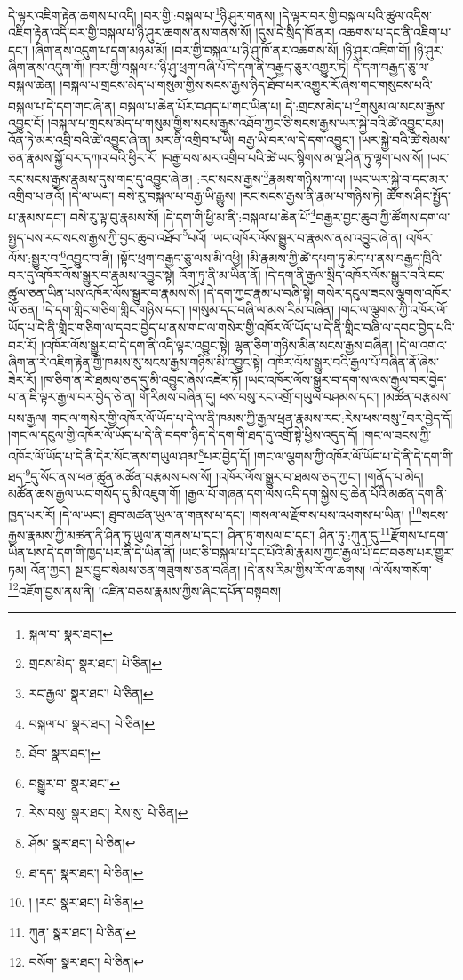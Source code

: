 དེ་ལྟར་འཇིག་རྟེན་ཆགས་པ་འདི། །བར་གྱི་:བསྐལ་པ་\footnote{སྐལ་བ་  སྣར་ཐང་། }ཉི་ཤུར་གནས། །དེ་ལྟར་བར་གྱི་བསྐལ་པའི་ཚུལ་འདིས་འཇིག་རྟེན་འདི་བར་གྱི་བསྐལ་པ་ཉི་ཤུར་ཆགས་ནས་གནས་སོ། །དུས་དེ་སྲིད་ཁོ་ནར། འཆགས་པ་དང་ནི་འཇིག་པ་དང་། །ཞིག་ནས་འདུག་པ་དག་མཉམ་མོ། །བར་གྱི་བསྐལ་པ་ཉི་ཤུ་ཁོ་ནར་འཆགས་སོ། །ཉི་ཤུར་འཇིག་གོ། །ཉི་ཤུར་ཞིག་ནས་འདུག་གོ། །བར་གྱི་བསྐལ་པ་ཉི་ཤུ་ཕྲག་བཞི་པོ་དེ་དག་ནི་བརྒྱད་ཅུར་འགྱུར་ཏེ། དེ་དག་བརྒྱད་ཅུ་ལ་བསྐལ་ཆེན། །བསྐལ་པ་གྲངས་མེད་པ་གསུམ་གྱིས་སངས་རྒྱས་ཉིད་ཐོབ་པར་འགྱུར་རོ་ཞེས་གང་གསུངས་པའི་བསྐལ་པ་དེ་དག་གང་ཞེ་ན། བསྐལ་པ་ཆེན་པོར་བཤད་པ་གང་ཡིན་པ། དེ་:གྲངས་མེད་པ་\footnote{གྲངས་མེད་  སྣར་ཐང་།  པེ་ཅིན། }གསུམ་ལ་སངས་རྒྱས་འབྱུང་ངོ། །བསྐལ་པ་གྲངས་མེད་པ་གསུམ་གྱིས་སངས་རྒྱས་འཐོབ་ཀྱང་ཅི་སངས་རྒྱས་ཡར་སྐྱེ་བའི་ཚེ་འབྱུང་ངམ། འོན་ཏེ་མར་འབྲི་བའི་ཚེ་འབྱུང་ཞེ་ན། མར་ནི་འགྲིབ་པ་ཡི། བརྒྱ་ཡི་བར་ལ་དེ་དག་འབྱུང་། །ཡར་སྐྱེ་བའི་ཚེ་སེམས་ཅན་རྣམས་སྐྱོ་བར་དཀའ་བའི་ཕྱིར་རོ། །བརྒྱ་བས་མར་འགྲིབ་པའི་ཚེ་ཡང་སྙིགས་མ་ལྔ་ཤིན་ཏུ་ལྷག་པས་སོ། །ཡང་རང་སངས་རྒྱས་རྣམས་དུས་གང་དུ་འབྱུང་ཞེ་ན། :རང་སངས་རྒྱས་\footnote{རང་རྒྱལ་  སྣར་ཐང་།  པེ་ཅིན། }རྣམས་གཉིས་ཀ་ལ། །ཡང་ཡར་སྐྱེ་བ་དང་མར་འགྲིབ་པ་ནའོ། །དེ་ལ་ཡང་། བསེ་རུ་བསྐལ་པ་བརྒྱ་ཡི་རྒྱུས། །རང་སངས་རྒྱས་ནི་རྣམ་པ་གཉིས་ཏེ། ཚོགས་ཤིང་སྤྱོད་པ་རྣམས་དང་། བསེ་རུ་ལྟ་བུ་རྣམས་སོ། །དེ་དག་གི་ཕྱི་མ་ནི་:བསྐལ་པ་ཆེན་པོ་\footnote{བསྐལ་པ་  སྣར་ཐང་།  པེ་ཅིན། }བརྒྱར་བྱང་ཆུབ་ཀྱི་ཚོགས་དག་ལ་སྤྱད་པས་རང་སངས་རྒྱས་ཀྱི་བྱང་ཆུབ་འཐོབ་\footnote{ཐོབ་  སྣར་ཐང་། }པའོ། །ཡང་འཁོར་ལོས་སྒྱུར་བ་རྣམས་ནམ་འབྱུང་ཞེ་ན། འཁོར་ལོས་:སྒྱུར་བ་\footnote{བསྒྱུར་བ་  སྣར་ཐང་། }འབྱུང་བ་ནི། །སྟོང་ཕྲག་བརྒྱད་ཅུ་ལས་མི་འཕྱི། །མི་རྣམས་ཀྱི་ཚེ་དཔག་ཏུ་མེད་པ་ནས་བརྒྱད་ཁྲིའི་བར་དུ་འཁོར་ལོས་སྒྱུར་བ་རྣམས་འབྱུང་སྟེ། འོག་ཏུ་ནི་མ་ཡིན་ནོ། །དེ་དག་ནི་རྒྱལ་སྲིད་འཁོར་ལོས་སྒྱུར་བའི་ངང་ཚུལ་ཅན་ཡིན་པས་འཁོར་ལོས་སྒྱུར་བ་རྣམས་སོ། །དེ་དག་ཀྱང་རྣམ་པ་བཞི་སྟེ། གསེར་དངུལ་ཟངས་ལྕགས་འཁོར་ལོ་ཅན། །དེ་དག་གླིང་གཅིག་གླིང་གཉིས་དང་། །གསུམ་དང་བཞི་ལ་མས་རིམ་བཞིན། །གང་ལ་ལྕགས་ཀྱི་འཁོར་ལོ་ཡོད་པ་དེ་ནི་གླིང་གཅིག་ལ་དབང་བྱེད་པ་ནས་གང་ལ་གསེར་གྱི་འཁོར་ལོ་ཡོད་པ་དེ་ནི་གླིང་བཞི་ལ་དབང་བྱེད་པའི་བར་རོ། །འཁོར་ལོས་སྒྱུར་བ་དེ་དག་ནི་འདི་ལྟར་འབྱུང་སྟེ། ལྷན་ཅིག་གཉིས་མིན་སངས་རྒྱས་བཞིན། །དེ་ལ་འགའ་ཞིག་ན་རེ་འཇིག་རྟེན་གྱི་ཁམས་སུ་སངས་རྒྱས་གཉིས་མི་འབྱུང་སྟེ། འཁོར་ལོས་སྒྱུར་བའི་རྒྱལ་པོ་བཞིན་ནོ་ཞེས་ཟེར་རོ། །ཁ་ཅིག་ན་རེ་ཐམས་ཅད་དུ་མི་འབྱུང་ཞེས་འཛེར་ཏོ། །ཡང་འཁོར་ལོས་སྒྱུར་བ་དག་ས་ལས་རྒྱལ་བར་བྱེད་པ་ན་ཇི་ལྟར་རྒྱལ་བར་བྱེད་ཅེ་ན། གོ་རིམས་བཞིན་དུ། ཕས་བསུ་རང་འགྲོ་གཡུལ་བཤམས་དང་། །མཚོན་བརྩམས་པས་རྒྱལ། གང་ལ་གསེར་གྱི་འཁོར་ལོ་ཡོད་པ་དེ་ལ་ནི་ཁམས་ཀྱི་རྒྱལ་ཕྲན་རྣམས་རང་:རེས་ཕས་བསུ་\footnote{རེས་བསུ་  སྣར་ཐང་། རེས་སུ་  པེ་ཅིན། }བར་བྱེད་དོ། །གང་ལ་དངུལ་གྱི་འཁོར་ལོ་ཡོད་པ་དེ་ནི་བདག་ཉིད་དེ་དག་གི་ཐད་དུ་འགྲོ་སྟེ་ཕྱིས་འདུད་དོ། །གང་ལ་ཟངས་ཀྱི་འཁོར་ལོ་ཡོད་པ་དེ་ནི་དེར་སོང་ནས་གཡུལ་ཤམ་\footnote{ཤོམ་  སྣར་ཐང་།  པེ་ཅིན། }པར་བྱེད་དོ། །གང་ལ་ལྕགས་ཀྱི་འཁོར་ལོ་ཡོད་པ་དེ་ནི་དེ་དག་གི་ཐད་\footnote{ཐ་དད་  སྣར་ཐང་།  པེ་ཅིན། }དུ་སོང་ནས་ཕན་ཚུན་མཚོན་བརྩམས་པས་སོ། །འཁོར་ལོས་སྒྱུར་བ་ཐམས་ཅད་ཀྱང་། །གནོད་པ་མེད། མཚོན་ཆས་རྒྱལ་ཡང་གསོད་དུ་མི་འཇུག་གོ། །རྒྱལ་པོ་གཞན་དག་ལས་འདི་དག་སྐྱེས་བུ་ཆེན་པོའི་མཚན་དག་ནི་ཁྱད་པར་རོ། །དེ་ལ་ཡང་། ཐུབ་མཚན་ཡུལ་ན་གནས་པ་དང་། །གསལ་ལ་རྫོགས་པས་འཕགས་པ་ཡིན། །\footnote{། །རང་  སྣར་ཐང་།  པེ་ཅིན། }སངས་རྒྱས་རྣམས་ཀྱི་མཚན་ནི་ཤིན་ཏུ་ཡུལ་ན་གནས་པ་དང་། ཤིན་ཏུ་གསལ་བ་དང་། ཤིན་ཏུ་:ཀུན་དུ་\footnote{ཀུན་  སྣར་ཐང་།  པེ་ཅིན། }རྫོགས་པ་དག་ཡིན་པས་དེ་དག་གི་ཁྱད་པར་ནི་དེ་ཡིན་ནོ། །ཡང་ཅི་བསྐལ་པ་དང་པོའི་མི་རྣམས་ཀྱང་རྒྱལ་པོ་དང་བཅས་པར་གྱུར་ཏམ། འོན་ཀྱང་། སྔར་བྱུང་སེམས་ཅན་གཟུགས་ཅན་བཞིན། །དེ་ནས་རིམ་གྱིས་རོ་ལ་ཆགས། །ལེ་ལོས་གསོག་\footnote{བསོག་  སྣར་ཐང་།  པེ་ཅིན། }འཇོག་བྱས་ནས་ནི། །འཛིན་བཅས་རྣམས་ཀྱིས་ཞིང་དཔོན་བསྟབས། 